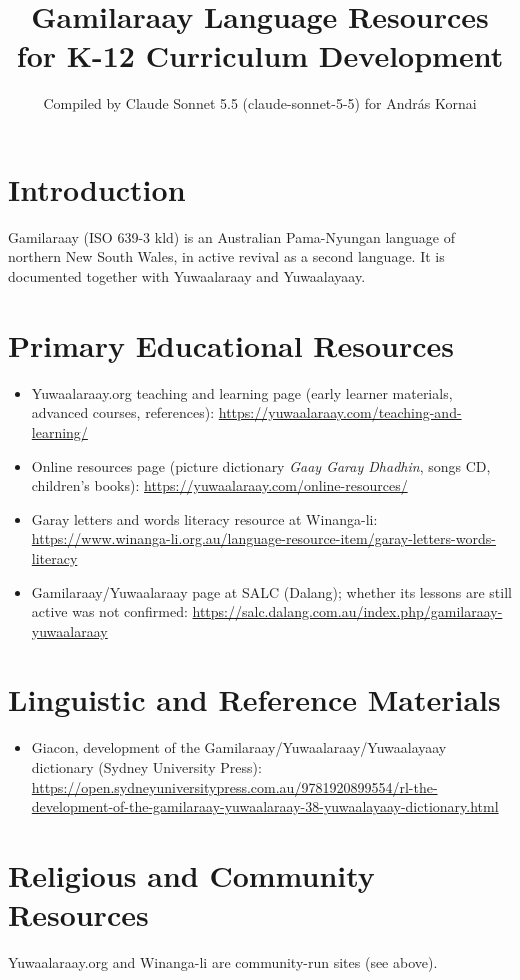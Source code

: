 \documentclass[12pt]{article}
\title{Gamilaraay Language Resources for K-12 Curriculum Development}
\author{Compiled by Claude Sonnet 5.5 (claude-sonnet-5-5) for Andr\'as Kornai}
\date{}
\begin{document}
\maketitle

\section{Introduction}
Gamilaraay (ISO 639-3 kld) is an Australian Pama-Nyungan language of northern New South Wales, in active revival as a second language. It is documented together with Yuwaalaraay and Yuwaalayaay.

\section{Primary Educational Resources}
\begin{itemize}
\item Yuwaalaraay.org teaching and learning page (early learner materials, advanced courses, references): \url{https://yuwaalaraay.com/teaching-and-learning/}
\item Online resources page (picture dictionary \emph{Gaay Garay Dhadhin}, songs CD, children's books): \url{https://yuwaalaraay.com/online-resources/}
\item Garay letters and words literacy resource at Winanga-li: \url{https://www.winanga-li.org.au/language-resource-item/garay-letters-words-literacy}
\item Gamilaraay/Yuwaalaraay page at SALC (Dalang); whether its lessons are still active was not confirmed: \url{https://salc.dalang.com.au/index.php/gamilaraay-yuwaalaraay}
\end{itemize}

\section{Linguistic and Reference Materials}
\begin{itemize}
\item Giacon, development of the Gamilaraay/Yuwaalaraay/Yuwaalayaay dictionary (Sydney University Press): \url{https://open.sydneyuniversitypress.com.au/9781920899554/rl-the-development-of-the-gamilaraay-yuwaalaraay-38-yuwaalayaay-dictionary.html}
\end{itemize}

\section{Religious and Community Resources}
Yuwaalaraay.org and Winanga-li are community-run sites (see above).
\end{document}
